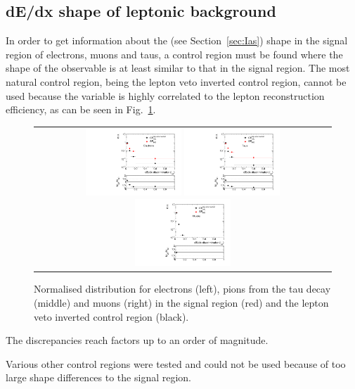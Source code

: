 \subsection{dE/dx shape of leptonic background}
In order to get information about the \ias (see Section~\ref{sec:Ias}) shape in the signal region of electrons, muons and taus, a control region must be found where the shape of the observable is at least similar to that in the
signal region.
The most natural control region, being the lepton veto inverted control region, cannot be used because the variable \ias is highly correlated to the lepton reconstruction efficiency, as can be seen in Fig.~\ref{fig:LeptonIasDist}.
\begin{figure}[!tb]
  \centering 
  \begin{tabular}{c}
    \includegraphics[width=0.33\textwidth]{figures/analysis/Background/hASmi_Electrons_MCCR_MCSR.pdf}
    \includegraphics[width=0.33\textwidth]{figures/analysis/Background/hASmi_Taus_MCCR_MCSR.pdf}
    \includegraphics[width=0.33\textwidth]{figures/analysis/Background/hASmi_Muons_MCCR_MCSR.pdf}
  \end{tabular}
  \caption{Normalised \ias distribution for electrons (left), pions from the tau decay (middle) and muons (right) in the signal region (red) and the lepton veto inverted control region (black).}
  \label{fig:LeptonIasDist}
\end{figure}
The discrepancies reach factors up to an order of magnitude.

Various other control regions were tested and could not be used because of too large \ias shape differences to the signal region.

